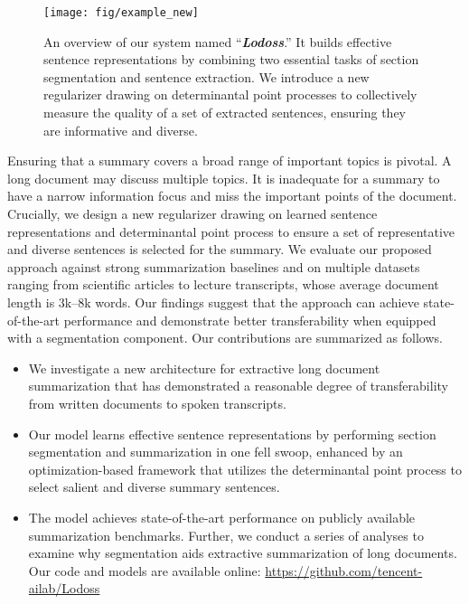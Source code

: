 \documentclass[11pt]{article}
\begin{document}
\begin{figure*}
\centering
\texttt{[image: fig/example\_new]}
\vspace{-0.05in}
\caption{An overview of our system named ``\textbf{\textsl{Lodoss}}.'' It builds effective sentence representations by combining two essential tasks of section segmentation and sentence extraction. We introduce a new regularizer  drawing on determinantal point processes to collectively measure the quality of a set of extracted sentences, ensuring they are informative and diverse. 
}
\label{fig:network}
\end{figure*}


Ensuring that a summary covers a broad range of important topics is pivotal.
A long document may discuss multiple topics. 
It is inadequate for a summary to have a narrow information focus and miss the important points of the document.
Crucially, we design a new regularizer drawing on learned sentence representations and determinantal point process \cite{Kulesza:2012,cho-etal-2019-improving}
to ensure a set of representative and diverse sentences
is selected for the summary.
We evaluate our proposed approach against strong summarization baselines 
and on multiple datasets ranging from scientific articles to lecture transcripts,
whose average document length is 3k--8k words.
Our findings suggest that the approach can achieve state-of-the-art performance
and demonstrate better transferability when equipped with a segmentation component.
Our contributions are summarized as follows.
\begin{itemize}[topsep=10pt,itemsep=0pt,leftmargin=*]
\item We investigate a new architecture for extractive long document summarization
that has demonstrated a reasonable degree of transferability from written documents to spoken transcripts.

\item Our model learns effective sentence representations by performing section segmentation and summarization in one fell swoop, enhanced by an optimization-based framework that utilizes the determinantal point process to select salient and diverse summary sentences. 

\item The model achieves state-of-the-art performance on publicly available summarization benchmarks.
Further, we conduct a series of analyses to examine why segmentation aids extractive summarization 
of long documents.
Our code and models are available online: \url{https://github.com/tencent-ailab/Lodoss}
\end{itemize}
\end{document}
